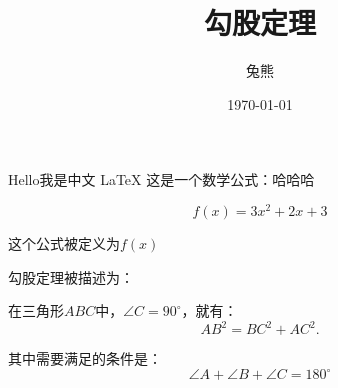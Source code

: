 \documentclass{article}
\title{\heiti 勾股定理}
\author{\kaishu 兔熊}
\date{\today}
\newcommand\degree{^\circ}
\begin{document}
    \maketitle
    Hello我是中文 \LaTeX
    这是一个数学公式：哈哈哈

    $$f(x)=3x^2+2x+3$$

    这个公式被定义为$f(x)$

    勾股定理被描述为：

    在三角形$ABC$中，$\angle C=90\degree$，就有：
    \begin{equation}
        AB^2 = BC^2 + AC^2.
    \end{equation}

    其中需要满足的条件是：
    \begin{equation}
        \angle A + \angle B + \angle C = 180\degree
    \end{equation}
\end{document}
